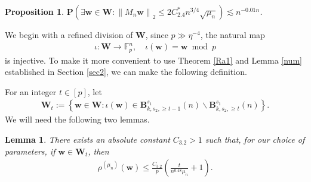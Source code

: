 \documentclass{article}
\numberwithin{equation}{section}
\theoremstyle{plain}
\newtheorem{lemma}{Lemma}[section]
\newtheorem{proposition}{Proposition}[section]
\begin{document}
\begin{proposition}\label{pro45}
$\textbf{P}\left(\exists \boldsymbol{w} \in \boldsymbol{W}:\left\|M_n \boldsymbol{w}\right\|_2 \leq 2 C^*_{2.4} n^{3 / 4}\sqrt{\mu_{n}}\right) \lesssim n^{-0.01 n}$.
\end{proposition}
We begin with a refined division of $\boldsymbol{W}$, since $p\gg\eta^{-4}$, the natural map
\begin{align*}
\iota: \boldsymbol{W} \rightarrow \mathbb{F}_p^n,\quad \iota(\boldsymbol{w})=\boldsymbol{w}\bmod p
\end{align*}
is injective. To make it more convenient to use Theorem \ref{Ra1} and Lemma \ref{num} established in Section \ref{sec2}, we can make the following definition.
\par
For an integer $t \in[p]$, let
\begin{align*}
\boldsymbol{W}_t:=\left\{\boldsymbol{w} \in \boldsymbol{W}: \iota(\boldsymbol{w}) \in \boldsymbol{B}_{k, s_2, \geq t-1}^{s_1}(n) \backslash \boldsymbol{B}_{k, s_2, \geq t}^{s_1}(n)\right\} .
\end{align*}
We will need the following two lemmas.
\begin{lemma}\label{lem47}
There exists an absolute constant $C_{3.2}>1$ such that, for our choice of parameters, if $\boldsymbol{w} \in \boldsymbol{W}_t$, then
\begin{align*}
\rho^{(\mu_{n})}(\boldsymbol{w}) \leq \frac{C_{3.2}}{p}\left(\frac{t}{n^{0.48}\mu_{n}}+1\right).
\end{align*}
\end{lemma}
\end{document}
